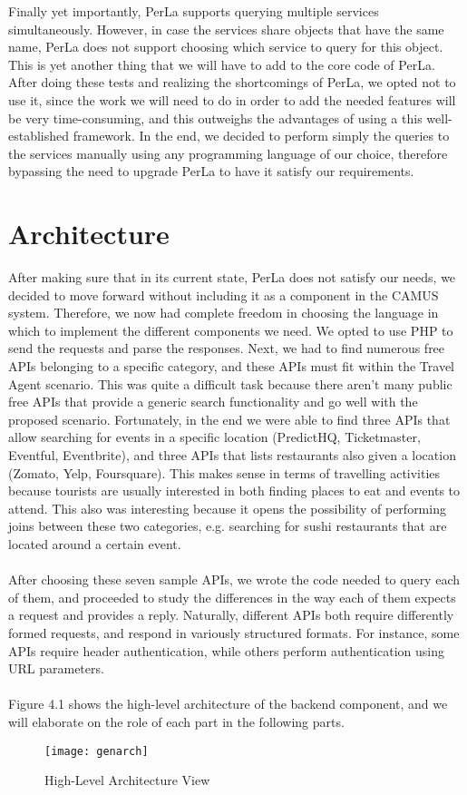 Finally yet importantly, PerLa supports querying multiple services simultaneously. However, in case the services share objects that have the same name, PerLa does not support choosing which service to query for this object. This is yet another thing that we will have to add to the core code of PerLa. After doing these tests and realizing the shortcomings of PerLa, we opted not to use it, since the work we will need to do in order to add the needed features will be very time-consuming, and this outweighs the advantages of using a this well-established framework. In the end, we decided to perform simply the queries to the services manually using any programming language of our choice, therefore bypassing the need to upgrade PerLa to have it satisfy our requirements.
\newpage
\section{Architecture}
\label{sec:architecture}
After making sure that in its current state, PerLa does not satisfy our needs, we decided to move forward without including it as a component in the CAMUS system. Therefore, we now had complete freedom in choosing the language in which to implement the different components we need. We opted to use PHP to send the requests and parse the responses. Next, we had to find numerous free APIs belonging to a specific category, and these APIs must fit within the Travel Agent scenario. This was quite a difficult task because there aren't many public free APIs that provide a generic search functionality and go well with the proposed scenario. Fortunately, in the end we were able to find three APIs that allow searching for events in a specific location (PredictHQ, Ticketmaster, Eventful, Eventbrite), and three APIs that lists restaurants also given a location (Zomato, Yelp, Foursquare). This makes sense in terms of travelling activities because tourists are usually interested in both finding places to eat and events to attend. This also was interesting because it opens the possibility of performing joins between these two categories, e.g. searching for sushi restaurants that are located around a certain event.\\\\
After choosing these seven sample APIs, we wrote the code needed to query each of them, and proceeded to study the differences in the way each of them expects a request and provides a reply. Naturally, different APIs both require differently formed requests, and respond in variously structured formats. For instance, some APIs require header authentication, while others perform authentication using URL parameters.\\\\
Figure 4.1 shows the high-level architecture of the backend component, and we will elaborate on the role of each part in the following parts.
\newpage
\begin{figure}[h]
\centering
\texttt{[image: genarch]}
\caption{High-Level Architecture View}
\end{figure}
\newpage
